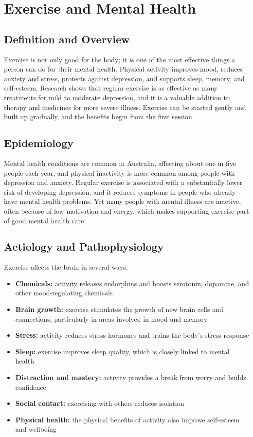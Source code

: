 \chapter{Exercise and Mental Health}

\section*{Definition and Overview}
Exercise is not only good for the body; it is one of the most effective things a person can do for their mental health. Physical activity improves mood, reduces anxiety and stress, protects against depression, and supports sleep, memory, and self-esteem. Research shows that regular exercise is as effective as many treatments for mild to moderate depression, and it is a valuable addition to therapy and medicines for more severe illness. Exercise can be started gently and built up gradually, and the benefits begin from the first session.

\section*{Epidemiology}
Mental health conditions are common in Australia, affecting about one in five people each year, and physical inactivity is more common among people with depression and anxiety. Regular exercise is associated with a substantially lower risk of developing depression, and it reduces symptoms in people who already have mental health problems. Yet many people with mental illness are inactive, often because of low motivation and energy, which makes supporting exercise part of good mental health care.

\section*{Aetiology and Pathophysiology}
Exercise affects the brain in several ways.
\begin{itemize}
    \item \textbf{Chemicals:} activity releases endorphins and boosts serotonin, dopamine, and other mood-regulating chemicals
    \item \textbf{Brain growth:} exercise stimulates the growth of new brain cells and connections, particularly in areas involved in mood and memory
    \item \textbf{Stress:} activity reduces stress hormones and trains the body's stress response
    \item \textbf{Sleep:} exercise improves sleep quality, which is closely linked to mental health
    \item \textbf{Distraction and mastery:} activity provides a break from worry and builds confidence
    \item \textbf{Social contact:} exercising with others reduces isolation
    \item \textbf{Physical health:} the physical benefits of activity also improve self-esteem and wellbeing
\end{itemize}

